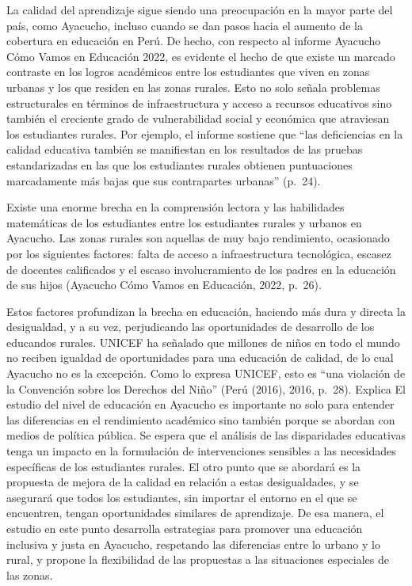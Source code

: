 \documentclass[
]{article}
\begin{document}
La calidad del aprendizaje sigue siendo una preocupación en la mayor
parte del país, como Ayacucho, incluso cuando se dan pasos hacia el
aumento de la cobertura en educación en Perú. De hecho, con respecto al
informe Ayacucho Cómo Vamos en Educación 2022, es evidente el hecho de
que existe un marcado contraste en los logros académicos entre los
estudiantes que viven en zonas urbanas y los que residen en las zonas
rurales. Esto no solo señala problemas estructurales en términos de
infraestructura y acceso a recursos educativos sino también el creciente
grado de vulnerabilidad social y económica que atraviesan los
estudiantes rurales. Por ejemplo, el informe sostiene que ``las
deficiencias en la calidad educativa también se manifiestan en los
resultados de las pruebas estandarizadas en las que los estudiantes
rurales obtienen puntuaciones marcadamente más bajas que sus
contrapartes urbanas'' (p.~24).

Existe una enorme brecha en la comprensión lectora y las habilidades
matemáticas de los estudiantes entre los estudiantes rurales y urbanos
en Ayacucho. Las zonas rurales son aquellas de muy bajo rendimiento,
ocasionado por los siguientes factores: falta de acceso a
infraestructura tecnológica, escasez de docentes calificados y el escaso
involucramiento de los padres en la educación de sus hijos (Ayacucho
Cómo Vamos en Educación, 2022, p.~26).

Estos factores profundizan la brecha en educación, haciendo más dura y
directa la desigualdad, y a su vez, perjudicando las oportunidades de
desarrollo de los educandos rurales. UNICEF ha señalado que millones de
niños en todo el mundo no reciben igualdad de oportunidades para una
educación de calidad, de lo cual Ayacucho no es la excepción. Como lo
expresa UNICEF, esto es ``una violación de la Convención sobre los
Derechos del Niño'' (Perú (2016), 2016, p.~28). Explica El estudio del
nivel de educación en Ayacucho es importante no solo para entender las
diferencias en el rendimiento académico sino también porque se abordan
con medios de política pública. Se espera que el análisis de las
disparidades educativas tenga un impacto en la formulación de
intervenciones sensibles a las necesidades específicas de los
estudiantes rurales. El otro punto que se abordará es la propuesta de
mejora de la calidad en relación a estas desigualdades, y se asegurará
que todos los estudiantes, sin importar el entorno en el que se
encuentren, tengan oportunidades similares de aprendizaje. De esa
manera, el estudio en este punto desarrolla estrategias para promover
una educación inclusiva y justa en Ayacucho, respetando las diferencias
entre lo urbano y lo rural, y propone la flexibilidad de las propuestas
a las situaciones especiales de las zonas.
\end{document}
